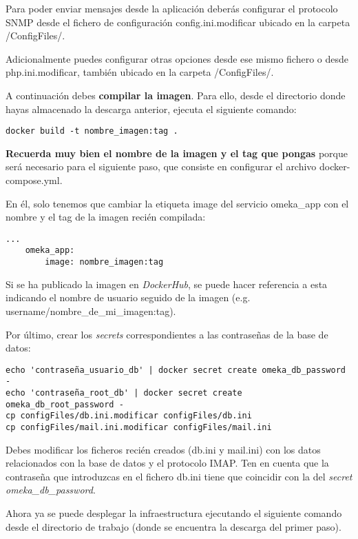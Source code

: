 Para poder enviar mensajes desde la aplicación deberás
configurar el protocolo SNMP desde el fichero de configuración {config.ini.modificar}
ubicado en la carpeta {/ConfigFiles/}.

Adicionalmente puedes configurar otras opciones desde ese mismo fichero o
desde {php.ini.modificar}, también ubicado en la carpeta {/ConfigFiles/}.

A continuación debes \textbf{compilar la imagen}. Para ello, desde el
directorio donde hayas almacenado la descarga anterior, ejecuta el
siguiente comando:

\begin{verbatim}
docker build -t nombre_imagen:tag .
\end{verbatim}

\textbf{Recuerda muy bien el nombre de la imagen y el tag que pongas}
porque será necesario para el siguiente paso, que consiste en configurar
el archivo {docker-compose.yml}.

En él, solo tenemos que cambiar la etiqueta {image} del servicio
{omeka\_app} con el nombre y el tag de la imagen recién compilada:

\begin{verbatim}
...
    omeka_app:
        image: nombre_imagen:tag
\end{verbatim} 

Si se ha publicado la imagen en \emph{DockerHub}, se puede hacer
referencia a esta indicando el nombre de usuario seguido de la imagen
(e.g. username/nombre\_de\_mi\_imagen:tag).

Por último, crear los \emph{secrets} correspondientes a las contraseñas
de la base de datos:

\begin{verbatim}
echo 'contraseña_usuario_db' | docker secret create omeka_db_password -
echo 'contraseña_root_db' | docker secret create omeka_db_root_password -
cp configFiles/db.ini.modificar configFiles/db.ini
cp configFiles/mail.ini.modificar configFiles/mail.ini
\end{verbatim} 

Debes modificar los ficheros recién creados ({db.ini} y {mail.ini}) con los datos relacionados
con la base de datos y el protocolo IMAP. Ten en cuenta que la contraseña que introduzcas en el
fichero {db.ini} tiene que coincidir con la del \emph{secret omeka\_db\_password}.

Ahora ya se puede desplegar la infraestructura ejecutando el siguiente
comando desde el directorio de trabajo (donde se encuentra la descarga
del primer paso).

